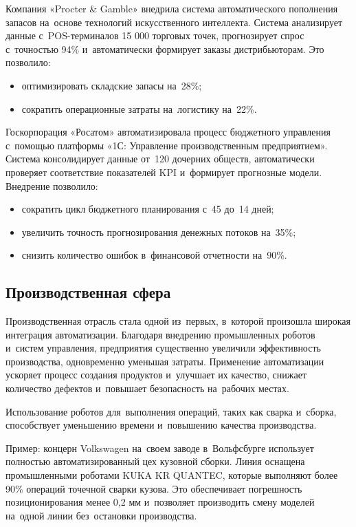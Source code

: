 \documentclass{ou}
\begin{document}
Компания «Procter \& Gamble» внедрила система автоматического пополнения запасов на~основе технологий искусственного интеллекта. Система анализирует данные с~POS-терминалов 15 000 торговых точек, прогнозирует спрос с~точностью 94\% и~автоматически формирует заказы дистрибьюторам. Это позволило:
\begin{itemize}[label=-, leftmargin=0em, itemindent=3.35em, nosep]
\item оптимизировать складские запасы на~28\%;
\item сократить операционные затраты на~логистику на~22\%.
\end{itemize}

Госкорпорация «Росатом» автоматизировала процесс бюджетного управления с~помощью платформы «1С: Управление производственным предприятием». Система консолидирует данные от~120 дочерних обществ, автоматически проверяет соответствие показателей KPI и~формирует прогнозные модели. Внедрение позволило:
\begin{itemize}[label=-, leftmargin=0em, itemindent=3.35em, nosep]
\item сократить цикл бюджетного планирования с~45 до~14 дней;
\item увеличить точность прогнозирования денежных потоков на~35\%;
\item снизить количество ошибок в~финансовой отчетности на~90\%.
\end{itemize}
\subsection{Производственная сфера}
Производственная отрасль стала одной из~первых, в~которой произошла широкая интеграция автоматизации. Благодаря внедрению промышленных роботов и~систем управления, предприятия существенно увеличили эффективность производства, одновременно уменьшая затраты. Применение автоматизации ускоряет процесс создания продуктов и~улучшает их качество, снижает количество дефектов и~повышает безопасность на~рабочих местах.

Использование роботов для~выполнения операций, таких как сварка и~сборка, способствует уменьшению времени и~повышению качества производства.

Пример: концерн Volkswagen на~своем заводе в~Вольфсбурге использует полностью автоматизированный цех кузовной сборки. Линия оснащена промышленными роботами KUKA KR QUANTEC, которые выполняют более 90\% операций точечной сварки кузова. Это обеспечивает погрешность позиционирования менее 0,2 мм и~позволяет производить смену моделей на~одной линии без~остановки производства.
\end{document}
